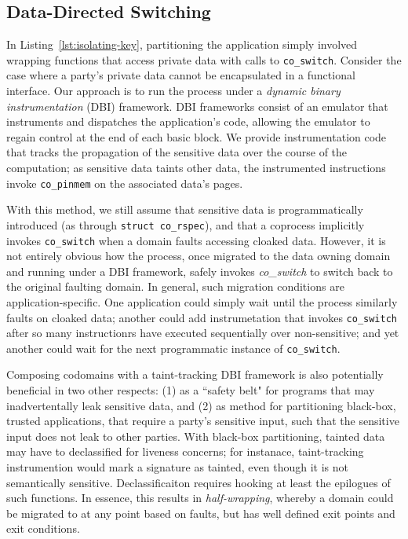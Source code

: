 \subsection{Data-Directed Switching}
\label{sec:data-directed-switching}

In Listing~\ref{lst:isolating-key}, partitioning the application simply
involved wrapping functions that access private data with calls to
\texttt{co\_switch}.
%
Consider the case where a party's private data cannot be encapsulated in a
functional interface.
%
Our approach is to run the process under a \emph{dynamic binary
instrumentation} (DBI) framework.
%
DBI frameworks consist of an emulator that instruments and dispatches the
application's code, allowing the emulator to regain control at the end of each
basic block.
%
We provide instrumentation code that tracks the propagation of the sensitive
data over the course of the computation; as sensitive data taints other data,
the instrumented instructions invoke \texttt{co\_pinmem} on the associated
data's pages.


With this  method, we still assume that sensitive data is programmatically
introduced (as through \texttt{struct co\_rspec}), and that a coprocess
implicitly invokes \texttt{co\_switch} when a domain faults accessing cloaked
data.
%
However, it is not entirely obvious how the process, once migrated to the data
owning domain and running under a DBI framework, safely invokes
\emph{co\_switch} to switch back to the original faulting domain.
%
In general, such migration conditions are application-specific.
%
One application could simply wait until the process similarly faults on
cloaked data; another could add instrumetation that invokes
\texttt{co\_switch} after so many instructionrs have executed sequentially over
non-sensitive; and yet another could wait for the next programmatic instance of
\texttt{co\_switch}.


Composing codomains with a taint-tracking DBI framework is also potentially
beneficial in two other respects: (1) as a ``safety belt" for programs
that may inadvertentally leak sensitive data, and (2) as method for
partitioning black-box, trusted applications, that require a party's sensitive
input, such that the sensitive input does not leak to other parties.
%
With black-box partitioning, tainted data may have to declassified for liveness
concerns; for instanace, taint-tracking instrumention would mark a signature as
tainted, even though it is not semantically sensitive.
%
Declassificaiton requires hooking at least the epilogues of such functions.
%
In essence, this results in \emph{half-wrapping}, whereby a domain could be
migrated to at any point based on faults, but has well defined exit points and
exit conditions.







